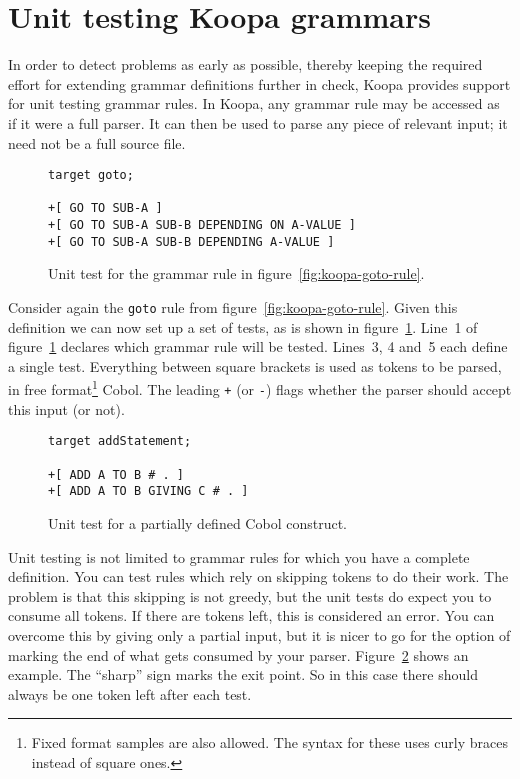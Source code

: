 \documentclass[a4paper]{article}
\begin{document}

\section{Unit testing Koopa grammars}
\label{testing}

In order to detect problems as early as possible, thereby keeping the required effort for extending grammar definitions further in check, Koopa provides support for unit testing grammar rules. In Koopa, any grammar rule may be accessed as if it were a full parser. It can then be used to parse any piece of relevant input; it need not be a full source file.

\begin{figure}
\centering
\begin{lstlisting}
target goto;

+[ GO TO SUB-A ]
+[ GO TO SUB-A SUB-B DEPENDING ON A-VALUE ]
+[ GO TO SUB-A SUB-B DEPENDING A-VALUE ]
\end{lstlisting}
\caption{Unit test for the grammar rule in figure~\ref{fig:koopa-goto-rule}.}
\label{fig:koopa-goto-test}
\end{figure}

Consider again the \lstinline|goto| rule from figure~\ref{fig:koopa-goto-rule}. Given this definition we can now set up a set of tests, as is shown in figure~\ref{fig:koopa-goto-test}. Line~1 of figure~\ref{fig:koopa-goto-test} declares which grammar rule will be tested. Lines~3, 4 and~5 each define a single test. Everything between square brackets is used as tokens to be parsed, in free format\footnote{\scriptsize Fixed format samples are also allowed. The syntax for these uses curly braces instead of square ones.} Cobol. The leading \lstinline|+| (or \lstinline|-|) flags whether the parser should accept this input (or not).

\begin{figure}
\centering
\begin{lstlisting}
target addStatement;

+[ ADD A TO B # . ]
+[ ADD A TO B GIVING C # . ]
\end{lstlisting}
\caption{Unit test for a partially defined Cobol construct.}
\label{fig:koopa-test-with-marker}
\end{figure}

Unit testing is not limited to grammar rules for which you have a complete definition. You can test rules which rely on skipping tokens to do their work. The problem is that this skipping is not greedy, but the unit tests do expect you to consume all tokens. If there are tokens left, this is considered an error. You can overcome this by giving only a partial input, but it is nicer to go for the option of marking the end of what gets consumed by your parser. Figure~\ref{fig:koopa-test-with-marker} shows an example. The ``sharp'' sign marks the exit point. So in this case there should always be one token left after each test.
\end{document}
